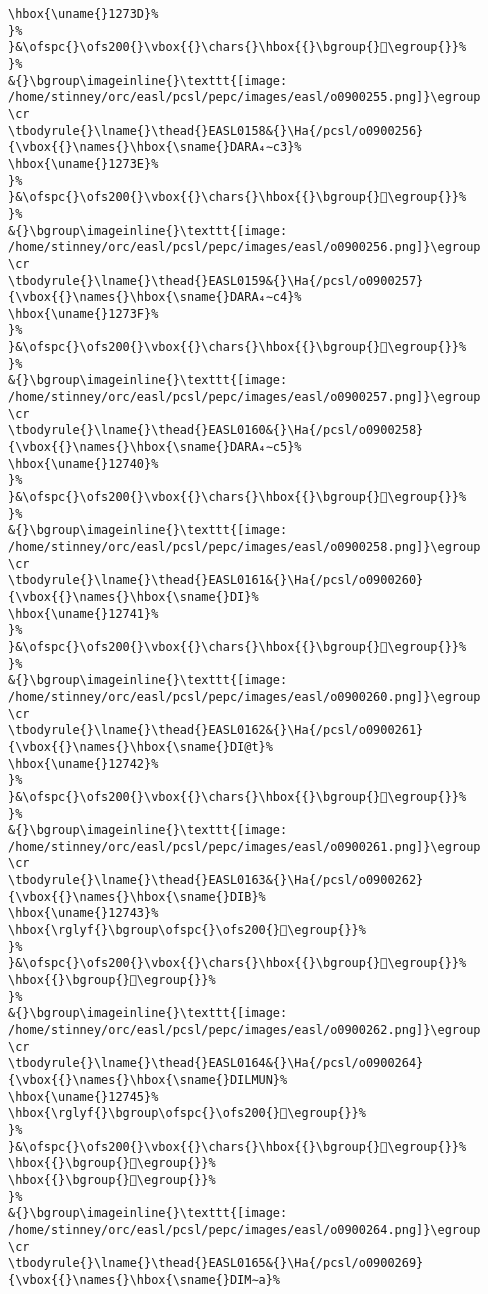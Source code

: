 \begin{verbatim}
\hbox{\uname{}1273D}%
}%
}&\ofspc{}\ofs200{}\vbox{{}\chars{}\hbox{{}\bgroup{}𒜽\egroup{}}%
}%
&{}\bgroup\imageinline{}\texttt{[image: /home/stinney/orc/easl/pcsl/pepc/images/easl/o0900255.png]}\egroup
\cr
\tbodyrule{}\lname{}\thead{}EASL0158&{}\Ha{/pcsl/o0900256}{\vbox{{}\names{}\hbox{\sname{}DARA₄∼c3}%
\hbox{\uname{}1273E}%
}%
}&\ofspc{}\ofs200{}\vbox{{}\chars{}\hbox{{}\bgroup{}𒜾\egroup{}}%
}%
&{}\bgroup\imageinline{}\texttt{[image: /home/stinney/orc/easl/pcsl/pepc/images/easl/o0900256.png]}\egroup
\cr
\tbodyrule{}\lname{}\thead{}EASL0159&{}\Ha{/pcsl/o0900257}{\vbox{{}\names{}\hbox{\sname{}DARA₄∼c4}%
\hbox{\uname{}1273F}%
}%
}&\ofspc{}\ofs200{}\vbox{{}\chars{}\hbox{{}\bgroup{}𒜿\egroup{}}%
}%
&{}\bgroup\imageinline{}\texttt{[image: /home/stinney/orc/easl/pcsl/pepc/images/easl/o0900257.png]}\egroup
\cr
\tbodyrule{}\lname{}\thead{}EASL0160&{}\Ha{/pcsl/o0900258}{\vbox{{}\names{}\hbox{\sname{}DARA₄∼c5}%
\hbox{\uname{}12740}%
}%
}&\ofspc{}\ofs200{}\vbox{{}\chars{}\hbox{{}\bgroup{}𒝀\egroup{}}%
}%
&{}\bgroup\imageinline{}\texttt{[image: /home/stinney/orc/easl/pcsl/pepc/images/easl/o0900258.png]}\egroup
\cr
\tbodyrule{}\lname{}\thead{}EASL0161&{}\Ha{/pcsl/o0900260}{\vbox{{}\names{}\hbox{\sname{}DI}%
\hbox{\uname{}12741}%
}%
}&\ofspc{}\ofs200{}\vbox{{}\chars{}\hbox{{}\bgroup{}𒝁\egroup{}}%
}%
&{}\bgroup\imageinline{}\texttt{[image: /home/stinney/orc/easl/pcsl/pepc/images/easl/o0900260.png]}\egroup
\cr
\tbodyrule{}\lname{}\thead{}EASL0162&{}\Ha{/pcsl/o0900261}{\vbox{{}\names{}\hbox{\sname{}DI@t}%
\hbox{\uname{}12742}%
}%
}&\ofspc{}\ofs200{}\vbox{{}\chars{}\hbox{{}\bgroup{}𒝂\egroup{}}%
}%
&{}\bgroup\imageinline{}\texttt{[image: /home/stinney/orc/easl/pcsl/pepc/images/easl/o0900261.png]}\egroup
\cr
\tbodyrule{}\lname{}\thead{}EASL0163&{}\Ha{/pcsl/o0900262}{\vbox{{}\names{}\hbox{\sname{}DIB}%
\hbox{\uname{}12743}%
\hbox{\rglyf{}\bgroup\ofspc{}\ofs200{}𒝃\egroup{}}%
}%
}&\ofspc{}\ofs200{}\vbox{{}\chars{}\hbox{{}\bgroup{}𒝃\egroup{}}%
\hbox{{}\bgroup{}𒝄\egroup{}}%
}%
&{}\bgroup\imageinline{}\texttt{[image: /home/stinney/orc/easl/pcsl/pepc/images/easl/o0900262.png]}\egroup
\cr
\tbodyrule{}\lname{}\thead{}EASL0164&{}\Ha{/pcsl/o0900264}{\vbox{{}\names{}\hbox{\sname{}DILMUN}%
\hbox{\uname{}12745}%
\hbox{\rglyf{}\bgroup\ofspc{}\ofs200{}𒝅\egroup{}}%
}%
}&\ofspc{}\ofs200{}\vbox{{}\chars{}\hbox{{}\bgroup{}𒝇\egroup{}}%
\hbox{{}\bgroup{}𒝅\egroup{}}%
\hbox{{}\bgroup{}𒝆\egroup{}}%
}%
&{}\bgroup\imageinline{}\texttt{[image: /home/stinney/orc/easl/pcsl/pepc/images/easl/o0900264.png]}\egroup
\cr
\tbodyrule{}\lname{}\thead{}EASL0165&{}\Ha{/pcsl/o0900269}{\vbox{{}\names{}\hbox{\sname{}DIM∼a}%

\end{verbatim}
